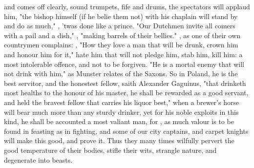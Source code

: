 
and comes off clearly, sound trumpets, fife and drums, the spectators will
applaud him, "the bishop himself (if he belie them not)
with his chaplain will stand by and do as much," , 'twas done like a prince. "Our Dutchmen invite all comers with a pail
and a dish," , "making barrels of their
bellies." , as one of their own
countrymen complains: , \etc{} "How they love a man that will be drunk, crown him and
honour him for it," hate him that will not pledge him, stab him, kill him: a
most intolerable offence, and not to be forgiven. "He is a
mortal enemy that will not drink with him," as Munster relates of the Saxons.
So in Poland, he is the best servitor, and the honestest fellow, saith
Alexander Gaguinus, "that drinketh most healths to the
honour of his master, he shall be rewarded as a good servant, and held the
bravest fellow that carries his liquor best," when a brewer's horse will bear
much more than any sturdy drinker, yet for his noble exploits in this kind, he
shall be accounted a most valiant man, for , as much valour is to be found in
feasting as in fighting, and some of our city captains, and carpet knights will
make this good, and prove it. Thus they many times wilfully pervert the good
temperature of their bodies, stifle their wits, strangle nature, and degenerate
into beasts.

